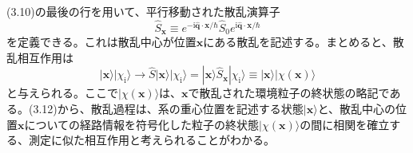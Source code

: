 \hypertarget{srcpage:122}{}\label{srcpage:122}
(3.10)の最後の行を用いて、平行移動された散乱演算子
\begin{equation}
\hat S_{\bm x}\equiv e^{-\mathrm i\hat{\bm q}\cdot\bm x/\hbar}\hat S_0e^{\mathrm i\hat{\bm q}\cdot\bm x/\hbar}
\tag{3.11}
\end{equation}
を定義できる。これは散乱中心が位置$\bm x$にある散乱を記述する。まとめると、散乱相互作用は
\begin{equation}
|\bm x\rangle|\chi_{\mathrm i}\rangle\longrightarrow\hat S|\bm x\rangle|\chi_{\mathrm i}\rangle
=|\bm x\rangle\hat S_{\bm x}|\chi_{\mathrm i}\rangle\equiv|\bm x\rangle|\chi(\bm x)\rangle
\tag{3.12}
\end{equation}
と与えられる。ここで$|\chi(\bm x)\rangle$は、$\bm x$で散乱された環境粒子の終状態の略記である。(3.12)から、散乱過程は、系の重心位置を記述する状態$|\bm x\rangle$と、散乱中心の位置$\bm x$についての経路情報を符号化した粒子の終状態$|\chi(\bm x)\rangle$の間に相関を確立する、測定に似た相互作用と考えられることがわかる。

